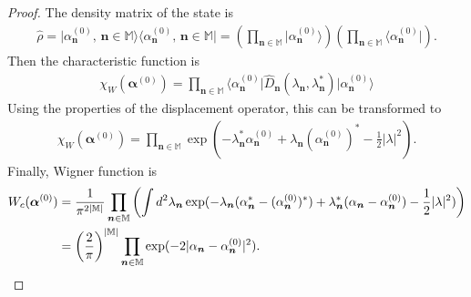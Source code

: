 \documentclass[12pt,aip,jmp,amssymb,amsmath]{revtex4-1}
\newcommand{\nvec}{\boldsymbol{n}}
\newcommand{\balpha}{\boldsymbol{\alpha}}
\newcommand{\restbasis}{\mathbb{M}}
\begin{document}
\begin{proof}
The density matrix of the state is
\begin{equation}\begin{split}
    \hat{\rho}
    = \vert \alpha_{\nvec}^{(0)},\, \nvec \in \restbasis \rangle
        \langle \alpha_{\nvec}^{(0)},\, \nvec \in \restbasis \vert
    = \left( \prod_{\nvec \in \restbasis} \vert \alpha_{\nvec}^{(0)} \rangle \right)
        \left( \prod_{\nvec \in \restbasis} \langle \alpha_{\nvec}^{(0)} \vert \right).
\end{split}\end{equation}
Then the characteristic function is
\begin{equation}\begin{split}
    \chi_W (\balpha^{(0)})
    = \prod_{\nvec \in \restbasis}
        \langle \alpha_{\nvec}^{(0)} \vert
        \hat{D}_{\nvec} (\lambda_{\nvec}, \lambda_{\nvec}^*)
        \vert \alpha_{\nvec}^{(0)} \rangle
\end{split}\end{equation}
Using the properties of the displacement operator, this can be transformed to
\begin{equation}\begin{split}
    \chi_W (\balpha^{(0)})
    = \prod_{\nvec \in \restbasis}
        \exp(
            - \lambda_{\nvec}^* \alpha_{\nvec}^{(0)}
            + \lambda_{\nvec} (\alpha_{\nvec}^{(0)})^*
            - \frac{1}{2} |\lambda|^2
        ).
\end{split}\end{equation}
Finally, Wigner function is
\begin{equation}\begin{split}
    W_c (\balpha^{(0)})
    & = \frac{1}{\pi^{2|\restbasis|}} \prod_{\nvec \in \restbasis} \left(
        \int d^2\lambda_{\nvec}
            \exp(
                - \lambda_{\nvec} (\alpha_{\nvec}^* - (\alpha_{\nvec}^{(0)})^*)
                + \lambda_{\nvec}^* (\alpha_{\nvec} - \alpha_{\nvec}^{(0)})
                - \frac{1}{2} |\lambda|^2
            )
    \right) \\
    & = \left( \frac{2}{\pi} \right)^{|\restbasis|} \prod_{\nvec \in \restbasis}
        \exp(-2 |\alpha_{\nvec} - \alpha_{\nvec}^{(0)}|^2).
    \qedhere
\end{split}\end{equation}
\end{proof}
\end{document}
